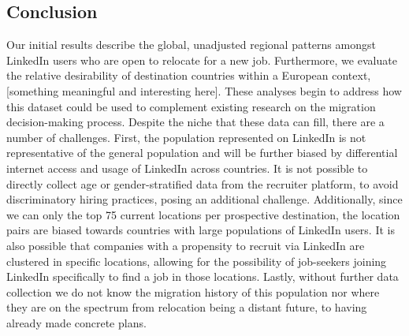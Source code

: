 \subsection*{Conclusion}
Our initial results describe the global, unadjusted regional patterns amongst LinkedIn users who are open to relocate for a new job. Furthermore, we evaluate the relative desirability of destination countries within a European context, [something meaningful and interesting here]. These analyses begin to address how this dataset could be used to complement existing research on the migration decision-making process. Despite the niche that these data can fill, there are a number of challenges. First, the population represented on LinkedIn is not representative of the general population and will be further biased by differential internet access and usage of LinkedIn across countries. It is not possible to directly collect age or gender-stratified data from the recruiter platform, to avoid discriminatory hiring practices, posing an additional challenge. Additionally, since we can only the top 75 current locations per prospective destination, the location pairs are biased towards countries with large populations of LinkedIn users. It is also possible that companies with a propensity to recruit via LinkedIn are clustered in specific locations, allowing for the possibility of job-seekers joining LinkedIn specifically to find a job in those locations. Lastly, without further data collection we do not know the migration history of this population nor where they are on the spectrum from relocation being a distant future, to having already made concrete plans.